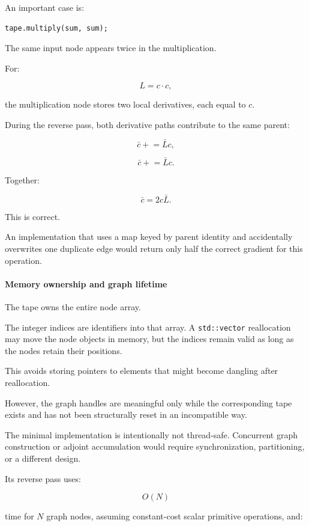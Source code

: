 An important case is:

\begin{verbatim}
tape.multiply(sum, sum);
\end{verbatim}

The same input node appears twice in the multiplication.

For:

\[
L=c\cdot c,
\]

the multiplication node stores two local derivatives, each equal to \(c\).

During the reverse pass, both derivative paths contribute to the same parent:

\[
\bar c\mathrel{+}=\bar Lc,
\]

\[
\bar c\mathrel{+}=\bar Lc.
\]

Together:

\[
\bar c=2c\bar L.
\]

This is correct.

An implementation that uses a map keyed by parent identity and accidentally overwrites one duplicate edge would return only half the correct gradient for this operation.

\paragraph{Memory ownership and graph lifetime}\label{memory-ownership-and-graph-lifetime}

The tape owns the entire node array.

The integer indices are identifiers into that array. A \texttt{std::vector} reallocation may move the node objects in memory, but the indices remain valid as long as the nodes retain their positions.

This avoids storing pointers to elements that might become dangling after reallocation.

However, the graph handles are meaningful only while the corresponding tape exists and has not been structurally reset in an incompatible way.

The minimal implementation is intentionally not thread-safe. Concurrent graph construction or adjoint accumulation would require synchronization, partitioning, or a different design.

Its reverse pass uses:

\[
O(N)
\]

time for \(N\) graph nodes, assuming constant-cost scalar primitive operations, and:


